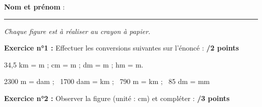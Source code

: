 \documentclass[a4paper,12pt]{article}
\begin{document}

\textbf{Nom et prénom} : \hfill {} \hfill \phantom{Nom et prénom :}%

\dline

\vspace{2.3cm}
\rule{\textwidth}{.5pt}

\emph{Chaque figure est à réaliser au crayon à papier. }

\textbf{Exercice n°1 :} Effectuer les conversions suivantes sur l'énoncé : \hfill \textbf{/2 points}

34,5 km =  m ;  cm =  m ;  dm =  m ;  hm =  m.

2300 m =  dam ; \ 1700 dam =  km ; \ 790 m =  km ; \ 85 dm =  mm

\bigskip\textbf{Exercice n°2 :} Observer la figure (unité : cm) et compléter : \hfill \textbf{/3 points}
\end{document}

